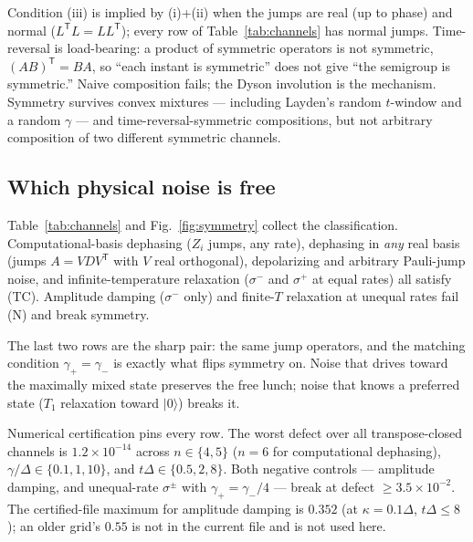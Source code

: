 \documentclass[aps,prx,reprint,floatfix,amsmath,amssymb,amsfonts]{revtex4-2}
\begin{document}
Condition (iii) is implied by (i)+(ii) when the jumps are real (up to
phase) and normal ($L^{\mathsf T}L = LL^{\mathsf T}$); every row of
Table~\ref{tab:channels} has normal jumps. Time-reversal is
load-bearing: a product of symmetric operators is not symmetric,
$(AB)^{\mathsf T} = BA$, so ``each instant is symmetric'' does not give
``the semigroup is symmetric.'' Naive composition fails; the Dyson
involution is the mechanism. Symmetry survives convex mixtures ---
including Layden's random $t$-window and a random $\gamma$ --- and
time-reversal-symmetric compositions, but not arbitrary composition of
two different symmetric channels.

\subsection{Which physical noise is free}

Table~\ref{tab:channels} and Fig.~\ref{fig:symmetry} collect the
classification. Computational-basis dephasing ($Z_i$ jumps, any rate),
dephasing in \emph{any} real basis (jumps $A = VDV^{\mathsf T}$ with $V$
real orthogonal), depolarizing and arbitrary Pauli-jump noise, and
infinite-temperature relaxation ($\sigma^-$ and $\sigma^+$ at equal
rates) all satisfy (TC). Amplitude damping ($\sigma^-$ only) and
finite-$T$ relaxation at unequal rates fail (N) and break symmetry.

The last two rows are the sharp pair: the same jump operators, and the
matching condition $\gamma_+ = \gamma_-$ is exactly what flips symmetry
on. Noise that drives toward the maximally mixed state preserves the
free lunch; noise that knows a preferred state ($T_1$ relaxation toward
$|0\rangle$) breaks it.

Numerical certification pins every row. The worst defect over all
transpose-closed channels is $1.2\times 10^{-14}$ across
$n\in\{4,5\}$ ($n=6$ for computational dephasing),
$\gamma/\Delta \in \{0.1,1,10\}$, and $t\Delta \in \{0.5,2,8\}$. Both
negative controls --- amplitude damping, and unequal-rate $\sigma^\pm$
with $\gamma_+ = \gamma_-/4$ --- break at defect
$\ge 3.5\times 10^{-2}$. The certified-file maximum for amplitude
damping is $0.352$ (at $\kappa = 0.1\Delta$, $t\Delta \le 8$); an older
grid's $0.55$ is not in the current file and is not used here.
\end{document}
